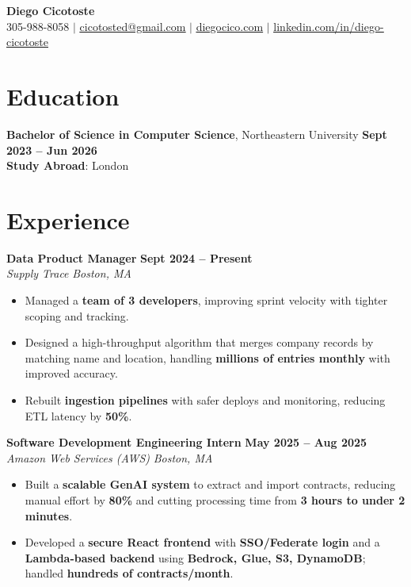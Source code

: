 \documentclass[8pt]{resume}
\begin{document}
\begin{center}
    \textbf{\Huge Diego Cicotoste} \\[1pt]
    \small
    305-988-8058 $|$
    \href{mailto:cicotosted@gmail.com}{\underline{cicotosted@gmail.com}} $|$
    \href{https://www.diegocico.com}{\underline{diegocico.com}} $|$
    \href{https://linkedin.com/in/diego-cicotoste}{\underline{linkedin.com/in/diego-cicotoste}}
\end{center}

\section{Education}
\textbf{Bachelor of Science in Computer Science}, Northeastern University
\hfill \textbf{Sept 2023 – Jun 2026}\\
\textbf{Study Abroad}: London

\section{Experience}

\textbf{Data Product Manager} \hfill \textbf{Sept 2024 – Present}\\
\textit{Supply Trace} \hfill \textit{Boston, MA}
\begin{itemize}
    \item Managed a \textbf{team of 3 developers}, improving sprint velocity with tighter scoping and tracking.
    \item Designed a high-throughput algorithm that merges company records by matching name and location, handling \textbf{millions of entries monthly} with improved accuracy.
    \item Rebuilt \textbf{ingestion pipelines} with safer deploys and monitoring, reducing ETL latency by \textbf{50\%}.
\end{itemize}

\textbf{Software Development Engineering Intern} \hfill \textbf{May 2025 – Aug 2025}\\
\textit{Amazon Web Services (AWS)} \hfill \textit{Boston, MA}
\begin{itemize}
    \item Built a \textbf{scalable GenAI system} to extract and import contracts, reducing manual effort by \textbf{80\%} and cutting processing time from \textbf{3 hours to under 2 minutes}.
    \item Developed a \textbf{secure React frontend} with \textbf{SSO/Federate login} and a \textbf{Lambda-based backend} using \textbf{Bedrock, Glue, S3, DynamoDB}; handled \textbf{hundreds of contracts/month}.
\end{itemize}
\end{document}
